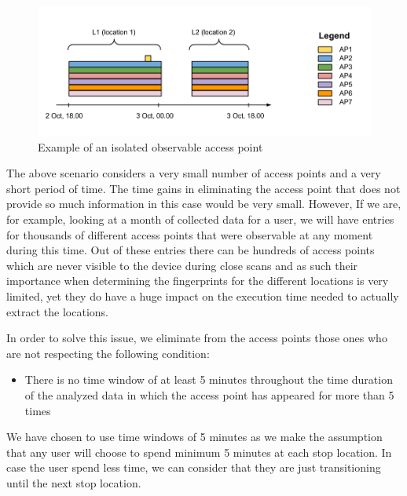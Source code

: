 \begin{figure}[ht]
\centering
\includegraphics[height = 0.35\textwidth]{figures/isolated_ap.png}
\caption{Example of an isolated observable access point}
\label{isolated_ap}
\end{figure}

The above scenario considers a very small number of access points and a very
short period of time. The time gains in eliminating the access point that does
not provide so much information in this case would be very small. However, If we
are, for example, looking at a month of collected data for a user, we will have
entries for thousands of different access points that were observable at any
moment during this time. Out of these entries there can be hundreds of access
points which are never visible to the device during close scans and as such
their importance when determining the fingerprints for the different locations
is very limited, yet they do have a huge impact on the execution time needed to
actually extract the locations.

In order to solve this issue, we eliminate from the access points those ones who
are not respecting the following condition:
\begin{itemize}
  \item There is no time window of at least 5 minutes throughout the time
  duration of the analyzed data in which the access point has appeared for more
  than 5 times
\end{itemize}

We have chosen to use time windows of 5 minutes as we make the assumption that
any user will choose to spend minimum 5 minutes at each stop location. In case
the user spend less time, we can consider that they are just transitioning until
the next stop location.
